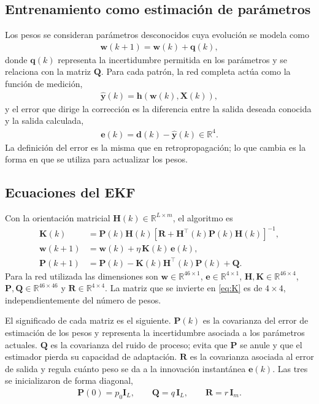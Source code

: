 \documentclass[conference]{IEEEtran}
\begin{document}
\subsection{Entrenamiento como estimación de parámetros}
Los pesos se consideran parámetros desconocidos cuya evolución se modela
como
\begin{align}
    \label{eq:proceso}
    \mathbf{w}(k+1)=\mathbf{w}(k)+\mathbf{q}(k),
\end{align}
donde $\mathbf{q}(k)$ representa la incertidumbre permitida en los
parámetros y se relaciona con la matriz $\mathbf{Q}$. Para cada patrón, la
red completa actúa como la función de medición,
\begin{align}
    \label{eq:medicion}
    \widehat{\mathbf{y}}(k)=\mathbf{h}\!\left(\mathbf{w}(k),\mathbf{X}(k)\right),
\end{align}
y el error que dirige la corrección es la diferencia entre la salida
deseada conocida y la salida calculada,
\begin{align}
    \label{eq:error}
    \mathbf{e}(k)=\mathbf{d}(k)-\widehat{\mathbf{y}}(k)\in\mathbb{R}^{4}.
\end{align}
La definición del error es la misma que en retropropagación; lo que cambia
es la forma en que se utiliza para actualizar los pesos.

\subsection{Ecuaciones del EKF}
Con la orientación matricial $\mathbf{H}(k)\in\mathbb{R}^{L\times m}$, el
algoritmo es \cite{b1,b3}
\begin{align}
    \label{eq:K}
    \mathbf{K}(k)&=\mathbf{P}(k)\mathbf{H}(k)\left[\mathbf{R}+\mathbf{H}^\top(k)\mathbf{P}(k)\mathbf{H}(k)\right]^{-1},\\
    \label{eq:updw}
    \mathbf{w}(k+1)&=\mathbf{w}(k)+\eta\,\mathbf{K}(k)\,\mathbf{e}(k),\\
    \label{eq:updP}
    \mathbf{P}(k+1)&=\mathbf{P}(k)-\mathbf{K}(k)\mathbf{H}^\top(k)\mathbf{P}(k)+\mathbf{Q}.
\end{align}
Para la red utilizada las dimensiones son
$\mathbf{w}\in\mathbb{R}^{46\times1}$, $\mathbf{e}\in\mathbb{R}^{4\times1}$,
$\mathbf{H},\mathbf{K}\in\mathbb{R}^{46\times4}$,
$\mathbf{P},\mathbf{Q}\in\mathbb{R}^{46\times46}$ y
$\mathbf{R}\in\mathbb{R}^{4\times4}$. La matriz que se invierte en
\eqref{eq:K} es de $4\times4$, independientemente del número de pesos.

El significado de cada matriz es el siguiente. $\mathbf{P}(k)$ es la
covarianza del error de estimación de los pesos y representa la
incertidumbre asociada a los parámetros actuales. $\mathbf{Q}$ es la
covarianza del ruido de proceso; evita que $\mathbf{P}$ se anule y que el
estimador pierda su capacidad de adaptación. $\mathbf{R}$ es la covarianza
asociada al error de salida y regula cuánto peso se da a la innovación
instantánea $\mathbf{e}(k)$. Las tres se inicializaron de forma diagonal,
\begin{align}
    \label{eq:init}
    \mathbf{P}(0)=p_0\mathbf{I}_{L},\qquad \mathbf{Q}=q\,\mathbf{I}_{L},\qquad \mathbf{R}=r\,\mathbf{I}_{m}.
\end{align}
\end{document}
